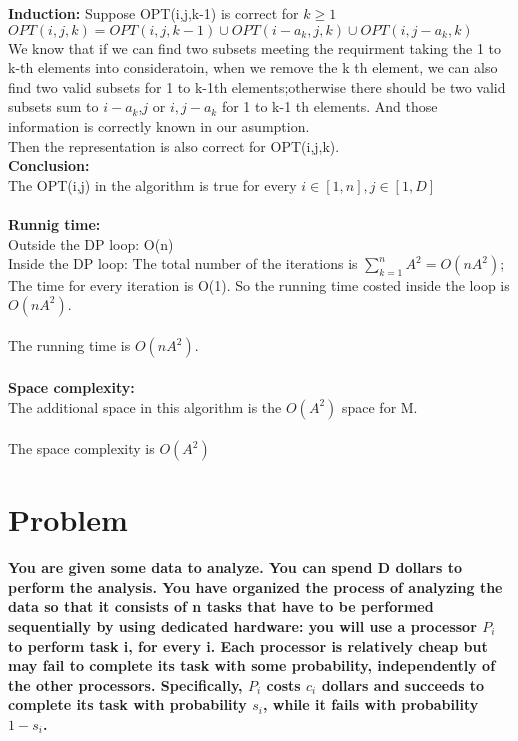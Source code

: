 \documentclass{article}
\begin{document}
\textbf{Induction:} Suppose OPT(i,j,k-1) is correct for $k \ge 1$ \\
$OPT(i,j,k) = OPT(i,j,k-1)\cup OPT(i-a_k,j,k)\cup OPT(i,j-a_k,k)$\\
We know that if we can find two subsets meeting the requirment taking the 1 to k-th elements into consideratoin, when we remove the k th element, we can also find two valid subsets for 1 to k-1th elements;otherwise there should be two valid subsets sum to $i-a_k$,$j$ or $i,j-a_k$ for 1 to k-1 th elements. And those information is correctly known in our asumption.\\
Then the representation is also correct for OPT(i,j,k).\\
\textbf{Conclusion:} \\
The OPT(i,j) in the algorithm is true for every $i \in [1,n], j \in [1,D]$\\\\
\textbf{\large Runnig time:\\}
Outside the DP loop: O(n)\\
Inside the DP loop: The total number of the iterations is  $\sum_{k=1}^n A^2  = O(nA^2)$;\\
The time for every iteration is O(1). So the running time costed inside the loop is $O(nA^2).$\\\\
The running time is $O(nA^2).$\\\\
\textbf{\large Space complexity:\\}
The additional space in this algorithm is the $O(A^2)$ space for M.\\\\
The space complexity is $O(A^2)$


\clearpage
\section{Problem \uppercase\expandafter{}}
\textbf{You are given some data to analyze. You can spend D dollars to perform the
analysis. You have organized the process of analyzing the data so that it consists of n tasks
that have to be performed sequentially by using dedicated hardware: you will use a processor
$P_i$ to perform task i, for every i. Each processor is relatively cheap but may fail to complete
its task with some probability, independently of the other processors. Specifically, $P_i$ costs $c_i$
dollars and succeeds to complete its task with probability $s_i$, while it fails with probability
$1 - s_i$.}
\end{document}

